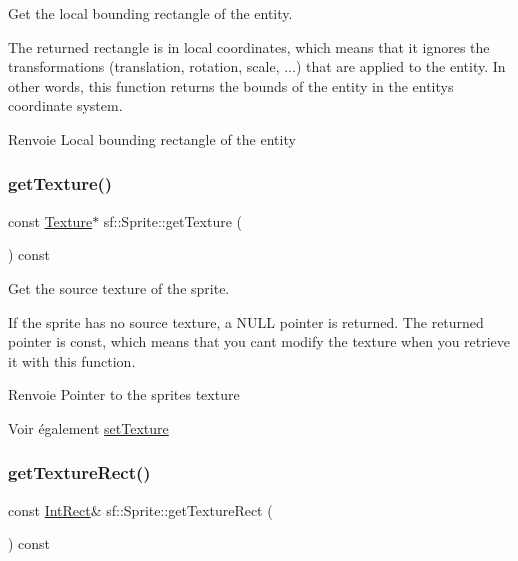 Get the local bounding rectangle of the entity. 

The returned rectangle is in local coordinates, which means that it ignores the transformations (translation, rotation, scale, ...) that are applied to the entity. In other words, this function returns the bounds of the entity in the entity\textquotesingle{}s coordinate system.

\begin{DoxyReturn}{Renvoie}
Local bounding rectangle of the entity 
\end{DoxyReturn}
\mbox{\label{classsf_1_1Sprite_a1a76155146c8ff37c4eb5a306b4e9ebe}} 
\subsubsection{\texorpdfstring{get\+Texture()}{getTexture()}}
{\footnotesize\ttfamily const \hyperlink{classsf_1_1Texture}{Texture}$\ast$ sf\+::\+Sprite\+::get\+Texture (\begin{DoxyParamCaption}{ }\end{DoxyParamCaption}) const}



Get the source texture of the sprite. 

If the sprite has no source texture, a N\+U\+LL pointer is returned. The returned pointer is const, which means that you can\textquotesingle{}t modify the texture when you retrieve it with this function.

\begin{DoxyReturn}{Renvoie}
Pointer to the sprite\textquotesingle{}s texture
\end{DoxyReturn}
\begin{DoxySeeAlso}{Voir également}
\hyperlink{classsf_1_1Sprite_a3729c88d88ac38c19317c18e87242560}{set\+Texture} 
\end{DoxySeeAlso}
\mbox{\label{classsf_1_1Sprite_a3492896fe7b63f58ae022c5b8bec5c98}} 
\subsubsection{\texorpdfstring{get\+Texture\+Rect()}{getTextureRect()}}
{\footnotesize\ttfamily const \hyperlink{classsf_1_1Rect}{Int\+Rect}\& sf\+::\+Sprite\+::get\+Texture\+Rect (\begin{DoxyParamCaption}{ }\end{DoxyParamCaption}) const}



